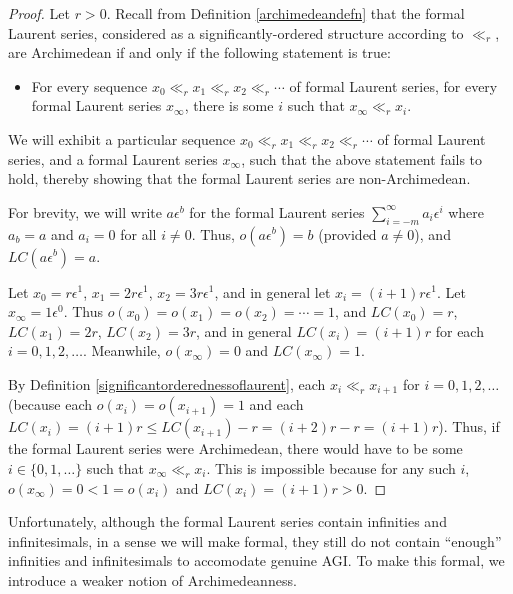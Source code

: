 \documentclass[twoside,11pt]{article}
\begin{document}
\begin{proof}
    Let $r>0$.
    Recall from Definition \ref{archimedeandefn} that the formal Laurent series,
    considered as a significantly-ordered structure according to $\ll_r$, are
    Archimedean if and only if the following statement is true:
    \begin{itemize}
    \item
        For every sequence $x_0\ll_r x_1\ll_r x_2 \ll_r \cdots$ of formal Laurent series,
        for every formal Laurent series $x_\infty$, there is some $i$ such that
        $x_\infty\ll_r x_i$.
    \end{itemize}
    We will exhibit a particular sequence $x_0\ll_r x_1\ll_r x_2\ll_r\cdots$
    of formal Laurent series, and a formal Laurent series $x_\infty$, such that the
    above statement fails to hold, thereby showing that the formal Laurent series
    are non-Archimedean.

    For brevity, we will write $a\epsilon^b$ for the formal Laurent series
    $\sum_{i=-m}^{\infty} a_i\epsilon^i$ where $a_b=a$ and $a_i=0$ for all $i\not=0$.
    Thus, $o(a\epsilon^b)=b$ (provided $a\not=0$), and $LC(a\epsilon^b)=a$.

    Let $x_0=r\epsilon^1$, $x_1=2r\epsilon^1$, $x_2=3r\epsilon^1$, and in general let
    $x_i=(i+1)r\epsilon^1$. Let $x_\infty=1\epsilon^0$.
    Thus $o(x_0)=o(x_1)=o(x_2)=\cdots=1$,
    and $LC(x_0)=r$, $LC(x_1)=2r$, $LC(x_2)=3r$, and in general $LC(x_i)=(i+1)r$
    for each $i=0,1,2,\ldots$. Meanwhile, $o(x_\infty)=0$ and $LC(x_\infty)=1$.

    By Definition \ref{significantorderednessoflaurent},
    each $x_i\ll_r x_{i+1}$ for $i=0,1,2,\ldots$ (because each $o(x_i)=o(x_{i+1})=1$
    and each $LC(x_i)=(i+1)r\leq LC(x_{i+1})-r=(i+2)r-r=(i+1)r$).
    Thus, if the formal Laurent series were Archimedean, there would have to be some
    $i\in\{0,1,\ldots\}$
    such that $x_\infty\ll_r x_i$. This is impossible because
    for any such $i$, $o(x_\infty)=0<1=o(x_i)$ and $LC(x_i)=(i+1)r>0$.
\end{proof}

Unfortunately, although the formal Laurent series contain infinities and infinitesimals,
in a sense we will make formal, they still do not contain ``enough'' infinities and
infinitesimals to accomodate genuine AGI. To make this formal, we introduce a weaker
notion of Archimedeanness.
\end{document}
